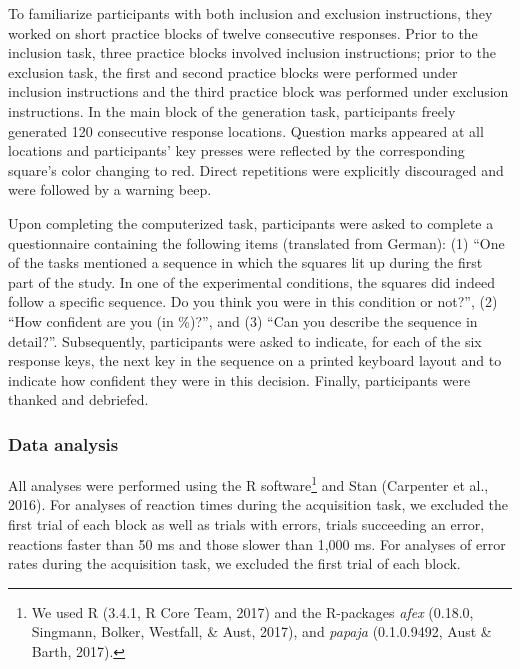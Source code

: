\documentclass[jou]{apa6}
\theoremstyle{definition}
\theoremstyle{definition}
\theoremstyle{definition}
\theoremstyle{remark}
\begin{document}
To familiarize participants with both inclusion and exclusion
instructions, they worked on short practice blocks of twelve consecutive
responses. Prior to the inclusion task, three practice blocks involved
inclusion instructions; prior to the exclusion task, the first and
second practice blocks were performed under inclusion instructions and
the third practice block was performed under exclusion instructions. In
the main block of the generation task, participants freely generated 120
consecutive response locations. Question marks appeared at all locations
and participants' key presses were reflected by the corresponding
square's color changing to red. Direct repetitions were explicitly
discouraged and were followed by a warning beep.

Upon completing the computerized task, participants were asked to
complete a questionnaire containing the following items (translated from
German): (1) \enquote{One of the tasks mentioned a sequence in which the
squares lit up during the first part of the study. In one of the
experimental conditions, the squares did indeed follow a specific
sequence. Do you think you were in this condition or not?}, (2)
\enquote{How confident are you (in \%)?}, and (3) \enquote{Can you
describe the sequence in detail?}. Subsequently, participants were asked
to indicate, for each of the six response keys, the next key in the
sequence on a printed keyboard layout and to indicate how confident they
were in this decision. Finally, participants were thanked and debriefed.

\subsubsection{Data analysis}\label{data-analysis}

All analyses were performed using the R software\footnote{We used R
  (3.4.1, R Core Team, 2017) and the R-packages \emph{afex} (0.18.0,
  Singmann, Bolker, Westfall, \& Aust, 2017), and \emph{papaja}
  (0.1.0.9492, Aust \& Barth, 2017).} and Stan (Carpenter et al., 2016).
For analyses of reaction times during the acquisition task, we excluded
the first trial of each block as well as trials with errors, trials
succeeding an error, reactions faster than 50 ms and those slower than
1,000 ms. For analyses of error rates during the acquisition task, we
excluded the first trial of each block.
\end{document}
